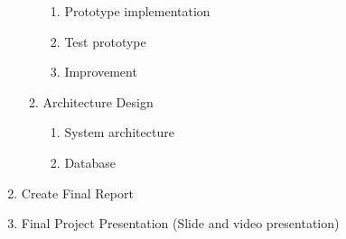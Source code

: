\documentclass[12pt,oneside,openright,a4paper]{cpe-english-project}
\begin{document}
\begin{enumerate}
\begin{enumerate}
\begin{enumerate}
      \item Prototype implementation
      \item Test prototype
     \item Improvement
      \end{enumerate}
     \item Architecture Design
   	\begin{enumerate}
  	 \item System architecture
      \item Database
      \end{enumerate}
  \end{enumerate}
  \item Create Final Report
  \item Final Project Presentation (Slide and video presentation)
\end{enumerate}
\end{document}
